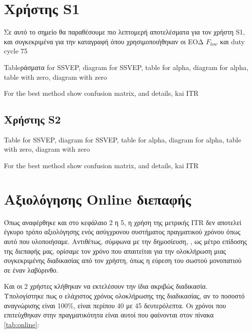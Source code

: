\documentclass[11pt,a4paper,english,greek,twoside]{../Thesis}
\begin{document}
\section{Χρήστης S1}
\par Σε αυτό το σημείο θα παραθέσουμε πιο λεπτομερή αποτελέσματα για τον χρήστη S1, και συγκεκριμένα για την καταγραφή όπου χρησιμοποιήθηκαν οι ΕΟΔ $F_{low}$ και duty cycle 75%
\par Tableράσματα for SSVEP, diagram for SSVEP, table for alpha, diagram for alpha, table with zero, diagram with zero
\par For the best method show confusion matrix, and details, kai ITR
\subsection{Χρήστης S2}
\par Table for SSVEP, diagram for SSVEP, table for alpha, diagram for alpha, table with zero, diagram with zero
\par For the best method show confusion matrix, and details, kai ITR


\section{Αξιολόγησης Online διεπαφής}

\par Όπως αναφέρθηκε και στο κεφάλαιο 2 η 5, η χρήση της μετρικής ITR δεν αποτελεί έγκυρο τρόπο αξιολόγησης ενός ασύγχρονου συστήματος πραγματικού χρόνου όπως αυτό που υλοποιήσαμε. Αντιθέτως, σύμφωνα με την δημοσίευση, \cite{Yuan2013-jp}, ως μέτρο επίδοσης της διεπαφής μας, ορίσαμε τον χρόνο που απαιτείται για την ολοκλήρωση μιας συγκεκριμένης διαδικασίας από τον χρήστη, όπως η εύρεση του σωστού μονοπατιού σε έναν λαβύρινθο.

\par Και οι 2 χρήστες κλήθηκαν να εκτελέσουν την ίδια ακριβώς διαδικασία. Υπολογίστηκε πως ο ελάχιστος χρόνος ολοκλήρωσης της διαδικασίας, αν το ποσοστό αναγνώρισης είναι 100\%, είναι περίπου 40 με 45 δευτερόλεπτα. Οι χρόνοι που επιτεύχθηκαν στην πραγματικότητα είναι αυτοί που φαίνονται στον πίνακα \ref{tab:online}:
\end{document}
